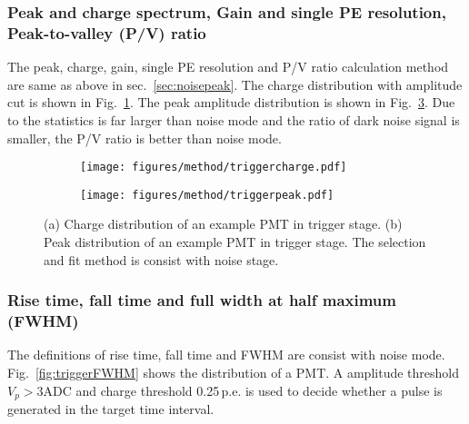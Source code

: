 \subsubsection{Peak and charge spectrum, Gain and single PE resolution, Peak-to-valley (P/V) ratio}
\label{sec:triggerpeak}
The peak, charge, gain, single PE resolution and P/V ratio calculation method are same as above in sec.~\ref{sec:noisepeak}. The charge distribution with amplitude cut is shown in Fig.~\ref{fig:triggercharge}. The peak amplitude distribution is shown in Fig.~\ref{fig:triggerpeak}. Due to the statistics is far larger than noise mode and the ratio of dark noise signal is smaller, the P/V ratio is better than noise mode.
\begin{figure}[!htbp]
    \centering
    \begin{subfigure}[b]{0.49\textwidth}
        \texttt{[image: figures/method/triggercharge.pdf]}
        \caption{}%
        \label{fig:triggercharge}
    \end{subfigure}
    \begin{subfigure}[b]{0.49\textwidth}
        \texttt{[image: figures/method/triggerpeak.pdf]}
        \caption{}%
        \label{fig:triggerpeak}
    \end{subfigure}
    \caption{(a) Charge distribution of an example PMT in trigger stage. (b) Peak distribution of an example PMT in trigger stage. The selection and fit method is consist with noise stage.}
\end{figure}

\subsubsection{Rise time, fall time and full width at half maximum (FWHM)}
\label{sec:triggerFWHM}
The definitions of rise time, fall time and FWHM are consist with noise mode. Fig.~\ref{fig:triggerFWHM} shows the distribution of a PMT. A amplitude threshold $V_{p}>3\mathrm{ADC}$ and charge threshold 0.25\,p.e. is used to decide whether a pulse is generated in the target time interval.


